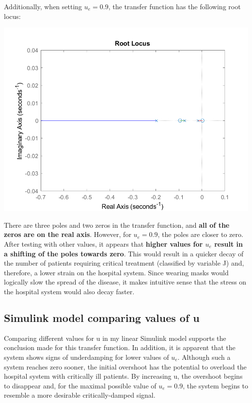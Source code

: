 \documentclass[fleqn]{article}
\begin{document}
Additionally, when setting $u_e = 0.9$, the transfer function has the following root locus:
\begin{center}
    \includegraphics[width=0.7\linewidth]{tf_root_locus_u_0_9}
\end{center}

There are three poles and two zeros in the transfer function, and \textbf{all of the zeros are on the real axis}. However, for $u_e = 0.9$, the poles are closer to zero. After testing with other values, it appears that \textbf{higher values for $u_e$ result in a shifting of the poles towards zero}. This would result in a quicker decay of the number of patients requiring critical treatment (classified by variable J) and, therefore, a lower strain on the hospital system. Since wearing masks would logically slow the spread of the disease, it makes intuitive sense that the stress on the hospital system would also decay faster.

\newpage

\subsection*{Simulink model comparing values of u}

Comparing different values for u in my linear Simulink model supports the conclusion made for this transfer function. In addition, it is apparent that the system shows signs of underdamping for lower values of $u_e$. Although such a system reaches zero sooner, the initial overshoot has the potential to overload the hospital system with critically ill patients. By increasing u, the overshoot begins to disappear and, for the maximal possible value of $u_e = 0.9$, the system begins to resemble a more desirable critically-damped signal.
\end{document}
